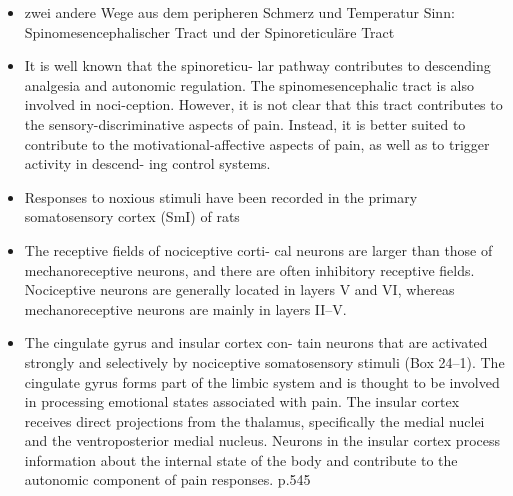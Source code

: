 \documentclass[12pt,a4paper,pdftex]{article}
\begin{document}
\begin{itemize}
    \item zwei andere Wege aus dem peripheren Schmerz und Temperatur Sinn: Spinomesencephalischer Tract und der Spinoreticuläre Tract
    \item It is well known that the spinoreticu-
    lar pathway contributes to descending analgesia and
    autonomic regulation. The spinomesencephalic tract is also involved in noci-ception. However, it is not clear that this tract contributes
    to the sensory-discriminative aspects of pain. Instead, it
    is better suited to contribute to the motivational-affective
    aspects of pain, as well as to trigger activity in descend-
    ing control systems. \cite{paxinos2014rat}
    \item Responses to noxious stimuli have been recorded
    in the primary somatosensory cortex (SmI) of rats
    \cite{paxinos2014rat}
    \item The receptive fields of nociceptive corti-
    cal neurons are larger than those of mechanoreceptive
    neurons, and there are often inhibitory receptive fields.
    Nociceptive neurons are generally located in layers V and VI, whereas mechanoreceptive neurons are mainly
    in layers II–V. \cite{paxinos2014rat}
    \item The cingulate gyrus and insular cortex con-
    tain neurons that are activated strongly and selectively
    by nociceptive somatosensory stimuli (Box 24–1). The
    cingulate gyrus forms part of the limbic system and is
    thought to be involved in processing emotional states
    associated with pain. The insular cortex receives direct
    projections from the thalamus, specifically the medial nuclei and the ventroposterior medial nucleus. Neurons
    in the insular cortex process information about the
    internal state of the body and contribute to the autonomic component of pain responses. \cite{kandel2013principles} p.545
\end{itemize}
\end{document}

